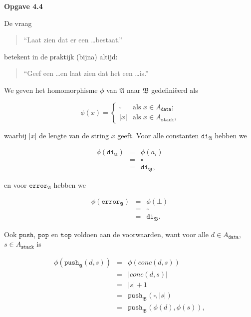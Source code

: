 \documentclass[a4paper,11pt]{article}
\begin{document}
{\bf Opgave 4.4}

De vraag
\begin{quote}
``Laat zien dat er een \ldots bestaat.''
\end{quote}
betekent in de praktijk (bijna) altijd:
\begin{quote}
``Geef een \ldots en laat zien dat het een \ldots is.''
\end{quote}

We geven het homomorphisme $\phi$ van $\mathfrak{A}$ naar $\mathfrak{B}$
gedefini\"eerd als

\begin{displaymath}
\phi(x) = \begin{cases}
  \square & \text{als $x \in A_{\texttt{data}}$;} \\
  |x|     & \text{als $x \in A_{\texttt{stack}}$,}
\end{cases}
\end{displaymath}

waarbij $|x|$ de lengte van de string $x$ geeft. Voor alle constanten
$\texttt{di}_{\mathfrak{A}}$ hebben we

\begin{eqnarray*}
\phi(\texttt{di}_{\mathfrak{A}}) & = & \phi(a_{i}) \\
                                 & = & \square \\
                                 & = & \texttt{di}_{\mathfrak{B}},
\end{eqnarray*}

en voor $\texttt{error}_{\mathfrak{A}}$ hebben we

\begin{eqnarray*}
\phi(\texttt{error}_{\mathfrak{A}}) & = & \phi(\bot) \\
                                    & = & \square \\
                                    & = & \texttt{di}_{\mathfrak{B}}.
\end{eqnarray*}

Ook $\texttt{push}$, $\texttt{pop}$ en $\texttt{top}$ voldoen aan de
voorwaarden, want voor alle $d \in A_{\texttt{data}}$, $s \in
A_{\texttt{stack}}$ is

\begin{eqnarray*}
\phi(\texttt{push}_{\mathfrak{A}}(d,s)) & = & \phi(conc(d,s)) \\
                                        & = & |conc(d,s)| \\
                                        & = & |s| + 1 \\
                                        & = & \texttt{push}_{\mathfrak{B}}(\square,|s|) \\
                                        & = & \texttt{push}_{\mathfrak{B}}(\phi(d),\phi(s)),
\end{eqnarray*}
\end{document}
